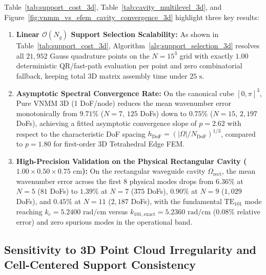 \documentclass[preprint,12pt]{elsarticle}
\begin{document}
Table~\ref{tab:support_cost_3d}, Table~\ref{tab:cavity_multilevel_3d}, and Figure~\ref{fig:vnmm_vs_efem_cavity_convergence_3d} highlight three key results:
\begin{enumerate}
    \item \textbf{Linear $\mathcal{O}(N_g)$ Support Selection Scalability:} As shown in Table~\ref{tab:support_cost_3d}, Algorithm~\ref{alg:support_selection_3d} resolves all $21{,}952$ Gauss quadrature points on the $N=15^3$ grid with exactly $1.00$ deterministic QR/fast-path evaluation per point and zero combinatorial fallback, keeping total 3D matrix assembly time under $25\text{ s}$.
    \item \textbf{Asymptotic Spectral Convergence Rate:} On the canonical cube $[0,\pi]^3$, Pure VNMM 3D (1 DoF/node) reduces the mean wavenumber error monotonically from $9.71\%$ ($N=7$, $125$ DoFs) down to $0.75\%$ ($N=15$, $2{,}197$ DoFs), achieving a fitted asymptotic convergence slope of $p = 2.62$ with respect to the characteristic DoF spacing $h_{\text{DoF}} = (|\Omega|/N_{\text{DoF}})^{1/3}$, compared to $p = 1.80$ for first-order 3D Tetrahedral Edge FEM.
    \item \textbf{High-Precision Validation on the Physical Rectangular Cavity ($1.00 \times 0.50 \times 0.75\text{ cm}$):} On the rectangular waveguide cavity $\Omega_{\text{rect}}$, the mean wavenumber error across the first 8 physical modes drops from $6.36\%$ at $N=5$ ($81$ DoFs) to $1.39\%$ at $N=7$ ($375$ DoFs), $0.90\%$ at $N=9$ ($1{,}029$ DoFs), and $0.45\%$ at $N=11$ ($2{,}187$ DoFs), with the fundamental $\text{TE}_{101}$ mode reaching $k_c = 5.2400\text{ rad/cm}$ versus $k_{101,\text{exact}} = 5.2360\text{ rad/cm}$ ($0.08\%$ relative error) and zero spurious modes in the operational band.
\end{enumerate}

\subsection{Sensitivity to 3D Point Cloud Irregularity and Cell-Centered Support Consistency}
\label{subsec:sec5_7_irregular_cavity}
\end{document}

